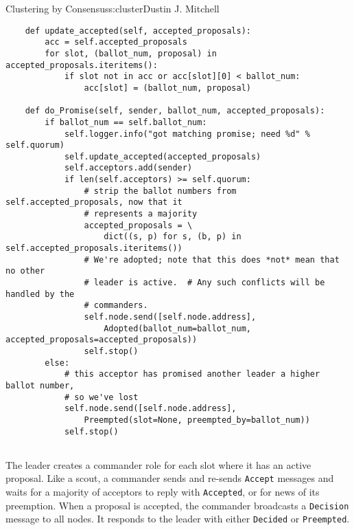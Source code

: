 \begin{aosachapter}{Clustering by Consensus}{s:cluster}{Dustin J. Mitchell}
\begin{verbatim}
    def update_accepted(self, accepted_proposals):
        acc = self.accepted_proposals
        for slot, (ballot_num, proposal) in accepted_proposals.iteritems():
            if slot not in acc or acc[slot][0] < ballot_num:
                acc[slot] = (ballot_num, proposal)

    def do_Promise(self, sender, ballot_num, accepted_proposals):
        if ballot_num == self.ballot_num:
            self.logger.info("got matching promise; need %d" % self.quorum)
            self.update_accepted(accepted_proposals)
            self.acceptors.add(sender)
            if len(self.acceptors) >= self.quorum:
                # strip the ballot numbers from self.accepted_proposals, now that it
                # represents a majority
                accepted_proposals = \ 
                    dict((s, p) for s, (b, p) in self.accepted_proposals.iteritems())
                # We're adopted; note that this does *not* mean that no other
                # leader is active.  # Any such conflicts will be handled by the
                # commanders.
                self.node.send([self.node.address],
                    Adopted(ballot_num=ballot_num, accepted_proposals=accepted_proposals))
                self.stop()
        else:
            # this acceptor has promised another leader a higher ballot number,
            # so we've lost
            self.node.send([self.node.address], 
                Preempted(slot=None, preempted_by=ballot_num))
            self.stop()
    
\end{verbatim}

The leader creates a commander role for each slot where it has an active
proposal. Like a scout, a commander sends and re-sends \texttt{Accept}
messages and waits for a majority of acceptors to reply with
\texttt{Accepted}, or for news of its preemption. When a proposal is
accepted, the commander broadcasts a \texttt{Decision} message to all
nodes. It responds to the leader with either \texttt{Decided} or
\texttt{Preempted}.


\end{aosachapter}
